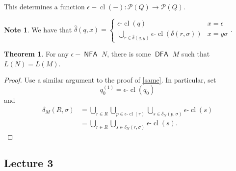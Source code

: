 \documentclass[10pt,letterpaper,cm]{nupset}
\theoremstyle{definition}
\newtheorem{note}[definition]{Note}
\theoremstyle{theorem}
\newtheorem{theorem}[definition]{Theorem}
\theoremstyle{remark}
\renewcommand{\P}{\mathcal P}
\newcommand{\1}{\mathbf{1}}
\newcommand{\0}{\vec 0}
\DeclareMathOperator{\cl}{cl}
\DeclareMathOperator{\DFA}{\mathsf{DFA}}
\DeclareMathOperator{\NFA}{\mathsf{NFA}}
\begin{document}
This determines a function $\epsilon{-}\cl(-): \P(Q) \to \P(Q)$.

\smallskip

\begin{note}
We have that $\hat{\delta}(q, x) = \begin{cases} \epsilon \text{-}\cl(q) & x = \epsilon
\\ \bigcup_{r\in \hat{\delta}(q, y)} \epsilon \text{-}\cl(\delta(r, \sigma)) & x = y\sigma 
\end{cases}.$
\end{note}

\begin{theorem}
For any $\epsilon{-}\NFA$ $N$, there is some $\DFA$ $M$ such that $L(N) = L(M)$.
\end{theorem}
\begin{proof}
Use a similar argument to the proof of \cref{same}. In particular, set $$q_0^{(1)} = \epsilon \text{-}\cl(q_0)$$ and 
\begin{align*}
\delta_M(R, \sigma)  & =  \bigcup_{r\in R}\bigcup_{p\in \epsilon \text{-}\cl(r)} \bigcup_{s\in \delta_N(p, \sigma)} \epsilon \text{-}\cl(s)
\\ & = \bigcup_{r\in R} \bigcup_{s\in \delta_N(r, \sigma)} \epsilon \text{-}\cl(s)
.\end{align*}
\end{proof}

\subsection{Lecture 3}
\end{document}

